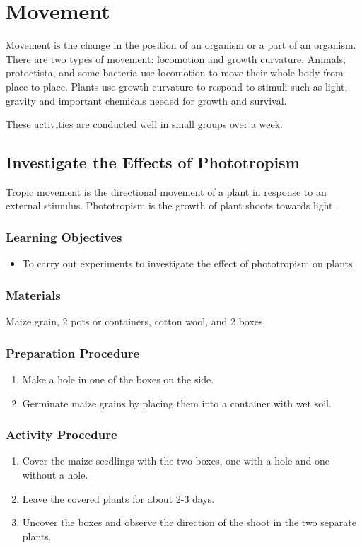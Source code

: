 \section{Movement}
Movement is the change in the position of an organism or a part of an organism. There are two types of movement: locomotion and growth curvature. Animals, protoctista, and some bacteria use locomotion to move their whole body from place to place. Plants use growth curvature to respond to stimuli such as light, gravity and important chemicals needed for growth and survival.

These activities are conducted well in small groups over a week. 

\subsection{Investigate the Effects of Phototropism}
Tropic movement is the directional movement of a plant in response to an external stimulus. Phototropism is the growth of plant shoots towards light.

\subsubsection*{Learning Objectives}
\begin{itemize}
\item{To carry out experiments to investigate the effect of phototropism on plants.}
\end{itemize}

\subsubsection*{Materials}
Maize grain, 2 pots or containers, cotton wool, and 2 boxes.

\subsubsection*{Preparation Procedure}
\begin{enumerate}
\item{Make a hole in one of the boxes on the side.}
\item{Germinate maize grains by placing them into a container with wet soil.}
\end{enumerate}

\subsubsection*{Activity Procedure}
\begin{enumerate}
\item{Cover the maize seedlings with the two boxes, one with a hole and one without a hole.}
\item{Leave the covered plants for about 2-3 days.}
\item{Uncover the boxes and observe the direction of the shoot in the two separate plants.}
\end{enumerate}

